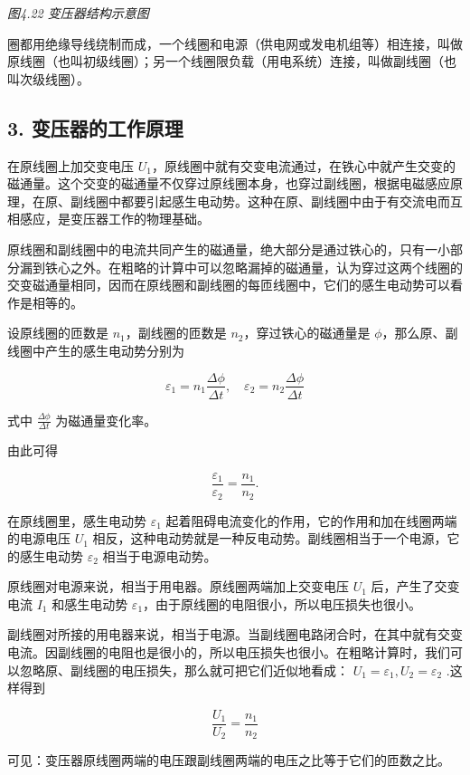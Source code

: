 \emph{图4.22 变压器结构示意图}

圈都用绝缘导线绕制而成，一个线圈和电源（供电网或发电机组等）相连接，叫做原线圈（也叫初级线圈）；另一个线圈限负载（用电系统）连接，叫做副线圈（也叫次级线圈）。

\subsection{3.
变压器的工作原理}\label{ux53d8ux538bux5668ux7684ux5de5ux4f5cux539fux7406}

在原线圈上加交变电压
\(U_{1}\)，原线圈中就有交变电流通过，在铁心中就产生交变的磁通量。这个交变的磁通量不仅穿过原线圈本身，也穿过副线圈，根据电磁感应原理，在原、副线圈中都要引起感生电动势。这种在原、副线圈中由于有交流电而互相感应，是变压器工作的物理基础。

原线圈和副线圈中的电流共同产生的磁通量，绝大部分是通过铁心的，只有一小部分漏到铁心之外。在粗略的计算中可以忽略漏掉的磁通量，认为穿过这两个线圈的交变磁通量相同，因而在原线圈和副线圈的每匝线圈中，它们的感生电动势可以看作是相等的。

设原线圈的匝数是 \(n_1\)，副线圈的匝数是 \(n_2\)，穿过铁心的磁通量是
\(\phi\)，那么原、副线圈中产生的感生电动势分别为

\[
\varepsilon_{1} = n_{1} \frac{\Delta \phi}{\Delta t}, \quad \varepsilon_{2} = n_{2} \frac{\Delta \phi}{\Delta t}
\]

式中 \(\frac{\Delta\phi}{\Delta t}\) 为磁通量变化率。

由此可得

\[
\frac{\varepsilon_{1}}{\varepsilon_{2}}=\frac{n_{1}}{n_{2}}. \tag{4.6}
\]

在原线圈里，感生电动势 \(\varepsilon_{1}\)
起着阻碍电流变化的作用，它的作用和加在线圈两端的电源电压 \(U_{1}\)
相反，这种电动势就是一种反电动势。副线圈相当于一个电源，它的感生电动势
\(\varepsilon_{2}\) 相当于电源电动势。

原线圈对电源来说，相当于用电器。原线圈两端加上交变电压 \(U_{1}\)
后，产生了交变电流 \(I_{1}\) 和感生电动势
\(\varepsilon_{1}\)，由于原线圈的电阻很小，所以电压损失也很小。

副线圈对所接的用电器来说，相当于电源。当副线圈电路闭合时，在其中就有交变电流。因副线圈的电阻也是很小的，所以电压损失也很小。在粗略计算时，我们可以忽略原、副线圈的电压损失，那么就可把它们近似地看成：
\(U_{1}=\varepsilon_{1},U_{2}=\varepsilon_{2}\) .这样得到

\[
\frac{U_{1}}{U_{2}} = \frac{n_{1}}{n_{2}} \tag{4.7}
\]

可见：变压器原线圈两端的电压跟副线圈两端的电压之比等于它们的匝数之比。

